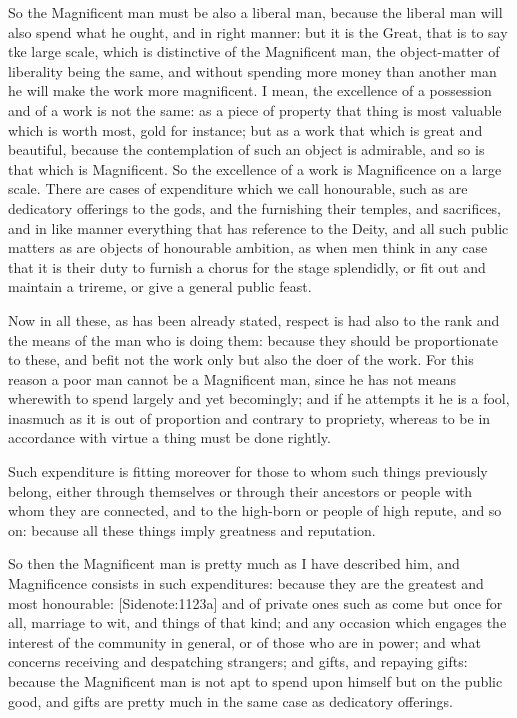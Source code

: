 So the Magnificent man must be also a liberal man, because the liberal
man will also spend what he ought, and in right manner: but it is the
Great, that is to say tke large scale, which is distinctive of the
Magnificent man, the object-matter of liberality being the same, and
without spending more money than another man he will make the work more
magnificent. I mean, the excellence of a possession and of a work is not
the same: as a piece of property that thing is most valuable which is
worth most, gold for instance; but as a work that which is great and
beautiful, because the contemplation of such an object is admirable,
and so is that which is Magnificent. So the excellence of a work is
Magnificence on a large scale. There are cases of expenditure which we
call honourable, such as are dedicatory offerings to the gods, and the
furnishing their temples, and sacrifices, and in like manner everything
that has reference to the Deity, and all such public matters as are
objects of honourable ambition, as when men think in any case that it is
their duty to furnish a chorus for the stage splendidly, or fit out and
maintain a trireme, or give a general public feast.

Now in all these, as has been already stated, respect is had also to the
rank and the means of the man who is doing them: because they should be
proportionate to these, and befit not the work only but also the doer of
the work. For this reason a poor man cannot be a Magnificent man, since
he has not means wherewith to spend largely and yet becomingly; and if
he attempts it he is a fool, inasmuch as it is out of proportion and
contrary to propriety, whereas to be in accordance with virtue a thing
must be done rightly.

Such expenditure is fitting moreover for those to whom such things
previously belong, either through themselves or through their ancestors
or people with whom they are connected, and to the high-born or people
of high repute, and so on: because all these things imply greatness and
reputation.

So then the Magnificent man is pretty much as I have described him,
and Magnificence consists in such expenditures: because they are the
greatest and most honourable: [Sidenote:1123a] and of private ones such
as come but once for all, marriage to wit, and things of that kind; and
any occasion which engages the interest of the community in general, or
of those who are in power; and what concerns receiving and despatching
strangers; and gifts, and repaying gifts: because the Magnificent man
is not apt to spend upon himself but on the public good, and gifts are
pretty much in the same case as dedicatory offerings.

